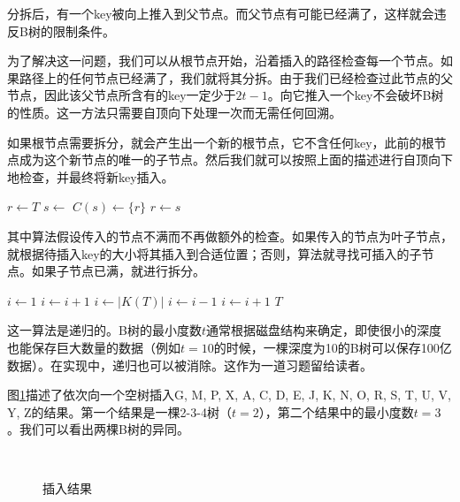 \documentclass[UTF8]{article}
\begin{document}
分拆后，有一个key被向上推入到父节点。而父节点有可能已经满了，这样就会违反B树的限制条件。

为了解决这一问题，我们可以从根节点开始，沿着插入的路径检查每一个节点。如果路径上的任何节点已经满了，我们就将其分拆。由于我们已经检查过此节点的父节点，因此该父节点所含有的key一定少于$2t-1$。向它推入一个key不会破坏B树的性质。这一方法只需要自顶向下处理一次而无需任何回溯。

如果根节点需要拆分，就会产生出一个新的根节点，它不含任何key，此前的根节点成为这个新节点的唯一的子节点。然后我们就可以按照上面的描述进行自顶向下地检查，并最终将新key插入。

\begin{algorithmic}[1]
  \State $r \gets T$
   
    \State $s \gets$ 
    \State $C(s) \gets \{r\}$
    \State {}
    \State $r \gets s$
  \EndIf
  \State \Return {}
\EndFunction
\end{algorithmic}

其中算法假设传入的节点不满而不再做额外的检查。如果传入的节点为叶子节点，就根据待插入key的大小将其插入到合适位置；否则，算法就寻找可插入的子节点。如果子节点已满，就进行拆分。

\begin{algorithmic}[1]
    \State $i \gets 1$
      \State $i \gets i+1$
    \EndWhile
    \State {}
  \Else
    \State $i \gets |K(T)|$
      \State $i \gets i-1$
    \EndWhile
      \State {}
        \State $i \gets i+1$
      \EndIf
    \EndIf
    \State {}
  \EndIf
  \State \Return $T$
\EndFunction
\end{algorithmic}

这一算法是递归的。B树的最小度数$t$通常根据磁盘结构来确定，即使很小的深度也能保存巨大数量的数据（例如$t=10$的时候，一棵深度为10的B树可以保存100亿数据）。在实现中，递归也可以被消除。这作为一道习题留给读者。

图\ref{fig:btree-insert}描述了依次向一个空树插入G, M, P, X, A, C, D, E, J, K, N, O, R, S, T, U, V, Y, Z的结果。第一个结果是一棵2-3-4树（$t=2$），第二个结果中的最小度数$t=3$。我们可以看出两棵B树的异同。

\begin{figure}[htbp]
  \centering
  \\
  \caption{插入结果} \label{fig:btree-insert}
\end{figure}
\end{document}

